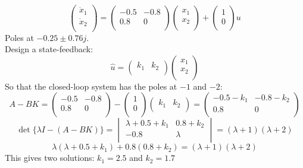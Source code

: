 \begin{ex}{}
\begin{equation*}
\begin{pmatrix}
\dot{x}_{1}\\
\dot{x}_{2}\\
\end{pmatrix} = 
\begin{pmatrix}
-0.5&-0.8\\
0.8&0\\
\end{pmatrix}
\begin{pmatrix}
x_{1}\\
x_{2}\\
\end{pmatrix}
+\begin{pmatrix}
1\\
0\\
\end{pmatrix}
u
\end{equation*}
Poles at $-0.25\pm 0.76j$.\ \\
Design a state-feedback:
\begin{equation*}
\hat{u} = \begin{pmatrix}
k_{1} & k_{2}\\
\end{pmatrix}
\begin{pmatrix}
x_{1}\\
x_{2}\\
\end{pmatrix}
\end{equation*}
So that the closed-loop system has the poles at $-1$ and $-2$:
\begin{equation*}
A-BK = \begin{pmatrix}
-0.5&-0.8\\
0.8&0\\
\end{pmatrix}-
\begin{pmatrix}
1\\
0\\
\end{pmatrix}
\begin{pmatrix} 
k_{1}&k_{2}\\
\end{pmatrix}
 = 
 \begin{pmatrix}
 -0.5-k_{1}&-0.8-k_{2}\\
 0.8&0\\
 \end{pmatrix}
\end{equation*}
\begin{equation*}
\det\{\lambda I-(A-BK)\} = \begin{vmatrix}
\lambda+0.5+k_{1} & 0.8+k_{2}\\
-0.8&\lambda\\
\end{vmatrix}
= (\lambda +1)(\lambda +2) 
\end{equation*}
\[ 
    \lambda(\lambda + 0.5 + k_{1}) + 0.8(0.8 + k_{2}) = (\lambda +1)(\lambda +2) 
\]
This gives two solutions: $k_{1}=2.5$ and $k_{2}=1.7$
\end{ex}


